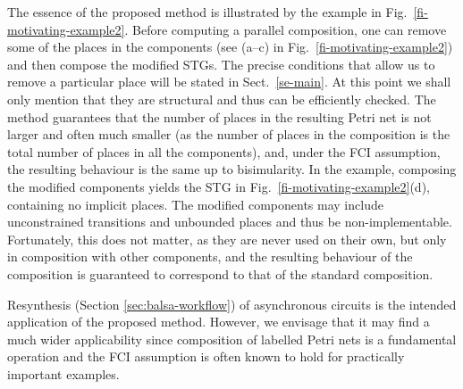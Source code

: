 The essence of the proposed method is illustrated by the example in Fig.~\ref{fi-motivating-example2}. Before computing a parallel composition, one can remove some of the places in the components (see (a--c) in Fig.~\ref{fi-motivating-example2}) and then compose the modified STGs. The precise conditions that allow us to remove a particular place will be stated in Sect.~\ref{se-main}. At this point we shall only mention that they are structural and thus can be efficiently checked. The method  guarantees that the number of places in the resulting Petri net is not larger and often much smaller (as the number of places in the composition is the total number of places in all the components), and, under the FCI assumption, the resulting behaviour is the same up to bisimularity. In the example, composing the modified components yields the STG in Fig.~\ref{fi-motivating-example2}(d), containing no implicit places. The modified components  may include unconstrained transitions and unbounded places and thus be non-implementable. Fortunately, this does not matter, as they are never used on their own, but only in composition with other components, and the resulting behaviour of the composition is guaranteed to correspond to that of the standard composition.

Resynthesis (Section \ref{sec:balsa-workflow}) of asynchronous circuits is the intended application of the proposed method. However, we envisage that it may find a much wider applicability since composition of labelled Petri nets is a fundamental operation and the FCI assumption is often known to hold for practically important examples.

